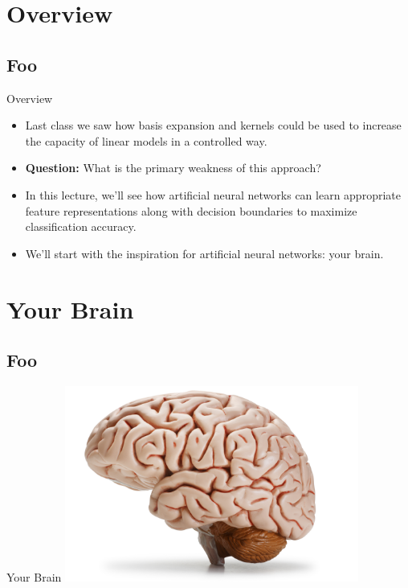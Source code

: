\documentclass[serif,xcolor=pdftex,dvipsnames,table,hyperref={bookmarks=false}]{beamer}
\begin{document}
\maketitlepage

\section{Overview}
\subsection{Foo}

\begin{frame}[t]{Overview}

\begin{itemize}
\setlength{\itemsep}{12pt}
\item Last class we saw how basis expansion and kernels could be used to
increase the capacity of linear models in a controlled way.

\pause \item \textbf{Question:} What is the primary weakness of this approach?

\pause \item In this lecture, we'll see how artificial neural networks can learn appropriate feature representations along with decision boundaries to maximize classification accuracy.

\pause \item We'll start with the inspiration for artificial neural networks: your brain.

\end{itemize}

\end{frame}


\section{Your Brain}
\subsection{Foo}

\begin{frame}[t]{Your Brain}
\center
\includegraphics[width=3.8in]{../Figures/brain.jpg}
\end{frame}
\end{document}
